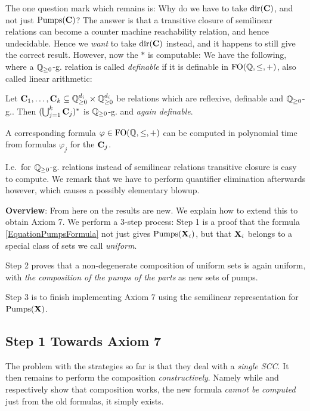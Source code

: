 The one question mark which remains is: Why do we have to take \(\operatorname{dir}(\mathbf{C})\), and not just \(\operatorname{Pumps}(\mathbf{C})\)? The answer is that a transitive closure of semilinear relations can become a counter machine reachability relation, and hence undecidable. Hence we \emph{want} to take \(\operatorname{dir}(\mathbf{C})\) instead, and it happens to still give the correct result. However, now the \(\ast\) is computable: We have the following, where a \(\mathbb{Q}_{\geq 0}\)-g. relation is called \emph{definable} if it is definable in \(\operatorname{FO}(\mathbb{Q}, \leq, +)\), also called linear arithmetic:

\begin{theorem}
Let \(\mathbf{C}_1, \dots, \mathbf{C}_k \subseteq \mathbb{Q}_{\geq 0}^{d_i} \times \mathbb{Q}_{\geq 0}^{d_i}\) be relations which are reflexive, definable and \(\mathbb{Q}_{\geq 0}\)-g.. Then \((\bigcup_{j=1}^k \mathbf{C}_j)^{\ast}\) is \(\mathbb{Q}_{\geq 0}\)-g. and \emph{again definable}.

A corresponding formula \(\varphi \in \operatorname{FO}(\mathbb{Q}, \leq, +)\) can be computed in polynomial time from formulas \(\varphi_j\) for the \(\mathbf{C}_j\).
\end{theorem}

I.e.\ for \(\mathbb{Q}_{\geq 0}\)-g. relations instead of semilinear relations transitive closure is easy to compute. We remark that we have to perform quantifier elimination afterwards however, which causes a possibly elementary blowup.

\textbf{Overview}: From here on the results are new. We explain how to extend this to obtain Axiom 7. We perform a \(3\)-step process: Step 1 is a proof that the formula \ref{EquationPumpsFormula} not just gives \(\operatorname{Pumps}(\mathbf{X}_i)\), but that \(\mathbf{X}_i\) belongs to a special class of sets we call \emph{uniform}.

Step 2 proves that a non-degenerate composition of uniform sets is again uniform, with \emph{the composition of the pumps of the parts} as new sets of pumps.

Step 3 is to finish implementing Axiom 7 using the semilinear representation for \(\operatorname{Pumps}(\mathbf{X})\).

\subsection{Step 1 Towards Axiom 7}

The problem with the strategies so far is that they deal with a \emph{single SCC}. It then remains to perform the composition \emph{constructively}. Namely while \cite{Leroux13} and \cite{Guttenberg24} respectively show that composition works, the new formula \emph{cannot be computed} just from the old formulas, it simply exists. 


